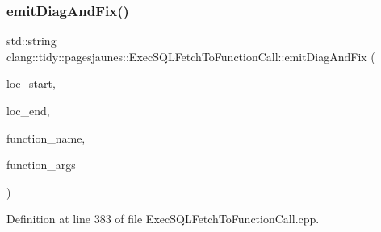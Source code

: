 \subsubsection{\texorpdfstring{emit\+Diag\+And\+Fix()}{emitDiagAndFix()}}
{\footnotesize\ttfamily std\+::string clang\+::tidy\+::pagesjaunes\+::\+Exec\+S\+Q\+L\+Fetch\+To\+Function\+Call\+::emit\+Diag\+And\+Fix (\begin{DoxyParamCaption}\item[{const Source\+Location \&}]{loc\+\_\+start,  }\item[{const Source\+Location \&}]{loc\+\_\+end,  }\item[{const std\+::string \&}]{function\+\_\+name,  }\item[{const std\+::string \&}]{function\+\_\+args }\end{DoxyParamCaption})}



Definition at line 383 of file Exec\+S\+Q\+L\+Fetch\+To\+Function\+Call.\+cpp.

